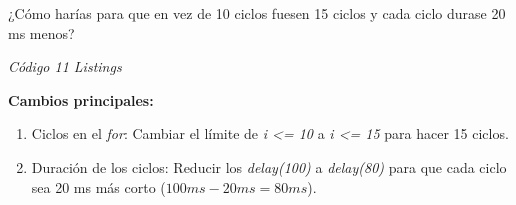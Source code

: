 ¿Cómo harías para que en vez de 10 ciclos fuesen 15 ciclos y cada ciclo durase 20 ms menos?

\emph{Código 11 Listings}

\textbf{Cambios principales:}
\begin{enumerate}
  \item Ciclos en el \emph{for}: Cambiar el límite de \emph{i <= 10} a \emph{i <= 15} para hacer 15 ciclos.
  \item Duración de los ciclos: Reducir los \emph{delay(100)} a \emph{delay(80)} para que cada ciclo sea 20 ms más corto ($100 ms - 20 ms = 80 ms$).
\end{enumerate}